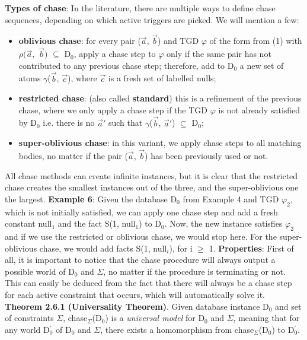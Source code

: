 \documentclass[11pt, a4paper, dvipsnames]{article}
\begin{document}
\textbf{Types of chase}: In the literature, there are multiple ways to define chase sequences, depending on which active triggers are picked. We will mention a few:
\begin{itemize}
	\item \textbf{oblivious chase}: for every pair ($\vec{a}$, $\vec{b}$) and TGD $\varphi$ of the form from (1) with $\rho(\vec{a},$ $\vec{b})$ $\subseteq$ D$_{0}$, apply a chase step to $\varphi$ only if the same pair has not contributed to any previous chase step; therefore, add to D$_{0}$ a new set of atoms $\gamma$($\vec{b}$, $\vec{c}$), where $\vec{c}$ is a fresh set of labelled nulls;
	\item \textbf{restricted chase}: (also called \textbf{standard}) this is a refinement of the previous chase, where we only apply a chase step if the TGD $\varphi$ is not already satisfied by D$_{0}$ i.e. there is no $\vec{a}'$ such that $\gamma$($\vec{b}$, $\vec{a}'$) $\subseteq$ D$_{0}$;
	\item \textbf{super-oblivious chase}: in this variant, we apply chase steps to all matching bodies, no matter if the pair ($\vec{a}$, $\vec{b}$) has been previously used or not.
\end{itemize}
All chase methods can create infinite instances, but it is clear that the restricted chase creates the smallest instances out of the three, and the super-oblivious one the largest.\newline
\textbf{Example 6}: Given the database D$_{0}$ from Example 4 and TGD $\varphi_{2}$, which is not initially satisfied, we can apply one chase step and add a fresh constant null$_{1}$ and the fact S(1, null$_{1}$) to D$_{0}$. Now, the new instance satisfies $\varphi_{2}$ and if we use the restricted or oblivious chase, we would stop here. For the super-oblivious chase, we would add facts S(1, null$_{i}$), for i $\geq$ 1. \newline
\textbf{Properties}: First of all, it is important to notice that the chase procedure will always output a possible world of D$_{0}$ and $\Sigma$, no matter if the procedure is terminating or not. This can easily be deduced from the fact that there will always be a chase step for each active constraint that occurs, which will automatically solve it.\newline
\textbf{Theorem 2.6.1 (Universality Theorem)}.  Given database instance D$_{0}$ and set of constraints $\Sigma$, chase$_{\Sigma}$(D$_{0}$) is a \textit{universal model} for D$_{0}$ and $\Sigma$, meaning that for any world D$^{'}_{0}$ of D$_{0}$ and $\Sigma$, there exists a homomorphism from chase$_{\Sigma}$(D$_{0}$) to D$^{'}_{0}$. \newline
\end{document}
